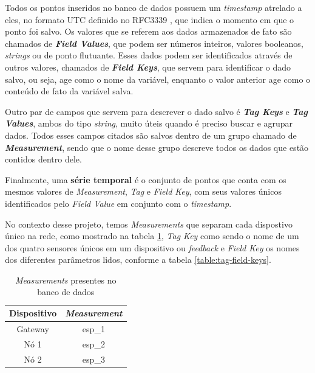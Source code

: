 \documentclass[../monografia.tex]{subfiles}
\begin{document}
Todos os pontos inseridos no banco de dados possuem um \textit{timestamp} atrelado a eles, no formato UTC definido no RFC3339 \cite{rfc3339}, que indica o momento em que o ponto foi salvo. Os valores que se referem aos dados armazenados de fato são chamados de \textit{\textbf{Field Values}}, que podem ser números inteiros, valores booleanos, \textit{strings} ou de ponto flutuante. Esses dados podem ser identificados através de outros valores, chamados de \textit{\textbf{Field Keys}}, que servem para identificar o dado salvo, ou seja, age como o nome da variável, enquanto o valor anterior age como o conteúdo de fato da variável salva.

Outro par de campos que servem para descrever o dado salvo é \textit{\textbf{Tag Keys}} e \textit{\textbf{Tag Values}}, ambos do tipo \textit{string}, muito úteis quando é preciso buscar e agrupar dados. Todos esses campos citados são salvos dentro de um grupo chamado de \textit{\textbf{Measurement}}, sendo que o nome desse grupo descreve todos os dados que estão contidos dentro dele.

Finalmente, uma \textbf{série temporal} é o conjunto de pontos que conta com os mesmos valores de \textit{Measurement}, \textit{Tag} e \textit{Field Key}, com seus valores únicos identificados pelo \textit{Field Value} em conjunto com o \textit{timestamp}.

No contexto desse projeto, temos \textit{Measurements} que separam cada dispostivo único na rede, como mostrado na tabela \ref{table:measurements}, \textit{Tag Key} como sendo o nome de um dos quatro sensores únicos em um dispositivo ou \textit{feedback} e \textit{Field Key} os nomes dos diferentes parâmetros lidos, conforme a tabela \ref{table:tag-field-keys}.


\begin{table}[h!]
	\centering
	\begin{tabular}{|c|c|}
	\hline
	\textbf{Dispositivo} & \textit{\textbf{Measurement}}  \\ \hline
	Gateway              & esp\_1                         \\ \hline
	Nó 1                 & esp\_2                         \\ \hline
	Nó 2                 & esp\_3                         \\ \hline 
	\end{tabular}
	\caption{\textit{Measurements} presentes no banco de dados}
	\label{table:measurements}
\end{table}
\end{document}
